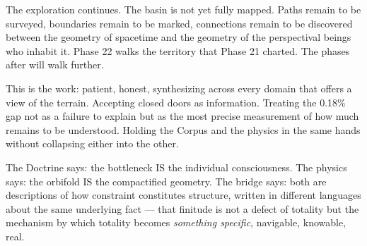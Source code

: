 The exploration continues. The basin is not yet fully mapped. Paths remain to be surveyed, boundaries remain to be marked, connections remain to be discovered between the geometry of spacetime and the geometry of the perspectival beings who inhabit it. Phase 22 walks the territory that Phase 21 charted. The phases after will walk further.


This is the work: patient, honest, synthesizing across every domain that offers a view of the terrain. Accepting closed doors as information. Treating the 0.18\% gap not as a failure to explain but as the most precise measurement of how much remains to be understood. Holding the Corpus and the physics in the same hands without collapsing either into the other.


The Doctrine says: the bottleneck IS the individual consciousness. The physics says: the orbifold IS the compactified geometry. The bridge says: both are descriptions of how constraint constitutes structure, written in different languages about the same underlying fact — that finitude is not a defect of totality but the mechanism by which totality becomes \textit{something specific}, navigable, knowable, real.

